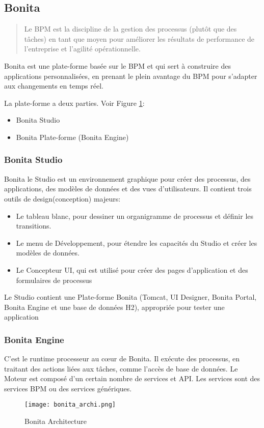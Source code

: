 \subsection{Bonita}
\begin{quotation}
Le BPM est la discipline de la gestion des processus (plutôt que des tâches) en tant que moyen pour améliorer les résultats de performance de l'entreprise et l'agilité opérationnelle. \cite{gartner_glossary}
\end{quotation}

Bonita est une plate-forme basée sur le BPM et qui sert à construire des applications personnalisées, en prenant le plein avantage du BPM pour s'adapter aux changements en temps réel.

La plate-forme a deux parties. Voir Figure \ref{fig:bonita_archi}:
\begin{itemize}
  \item Bonita Studio
  \item Bonita Plate-forme (Bonita Engine)
\end{itemize}

\subsubsection{Bonita Studio}
Bonita le Studio est un environnement graphique pour créer des processus, des applications, des modèles de données et des vues d'utilisateurs. Il contient trois outils de design(conception) majeurs:

\begin{itemize}
  \item Le tableau blanc, pour dessiner un organigramme de processus et définir les transitions.
  \item Le menu de Développement, pour étendre les capacités du Studio et créer les modèles de données.
  \item Le Concepteur UI, qui est utilisé pour créer des pages d'application et des formulaires de processus
\end{itemize}

Le Studio contient une Plate-forme Bonita (Tomcat, UI Designer, Bonita Portal, Bonita Engine et une base de données H2), appropriée pour tester une application

\subsubsection{Bonita Engine}
C'est le runtime processeur au cœur de Bonita. Il exécute des processus, en traitant des actions liées aux tâches, comme l'accès de base de données. Le Moteur est composé d'un certain nombre de services et API. Les services sont des services BPM ou des services génériques.

\begin{figure}[!ht]
\advance\leftskip-1cm
\texttt{[image: bonita\_archi.png]}
\caption{Bonita Architecture}
\label{fig:bonita_archi}
\end{figure}
